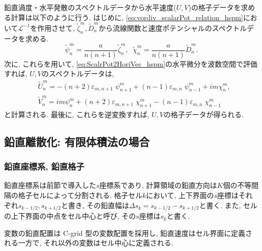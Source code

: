 鉛直渦度・水平発散のスペクトルデータから水平速度($U,V$)の格子データを求める計算は以下のように行う. 
はじめに, \eqref{eq:vordiv_scalarPot_relation_hspm}において$\mathscr{L}^{-1}$を作用させて, 
$\tilde{\zeta}^m_n, \tilde{D}^m_n$から流線関数と速度ポテンシャルのスペクトルデータを求める.
\begin{equation}
  \tilde{\psi}^m_n = \dfrac{a}{n(n+1)} \tilde{\zeta}^m_n,  \;\;
  \tilde{\chi}^m_n = \dfrac{a}{n(n+1)} \tilde{D}^m_n. 
\end{equation}
次に, これらを用いて, \eqref{eq:ScalrPot2HoriVec_hspm}の水平微分を波数空間で評価すれば, 
$U,V$のスペクトルデータは, 
\begin{equation}
\begin{split}
	&\tilde{U}^m_n 
	  = - (n+2)\varepsilon_{m,n+1} \;\psi^m_{n+1} 
	    + (n-1)\varepsilon_{m,n} \;\psi^m_{n-1} 
	    + im \chi^m_n, \\
	&\tilde{V}^m_n 
		= im \psi^m_n
		+ (n+2)\varepsilon_{m,n+1}\;\chi^m_{n+1} 
	    - (n-1)\varepsilon_{m,n} \;\chi^m_{n-1} 
\end{split}
\end{equation}
と計算される. 最後に, これらを逆変換すれば, $U,V$の格子データが得られる. 


\subsection{鉛直離散化: 有限体積法の場合}
\subsubsection*{鉛直座標系, 鉛直格子}
鉛直座標系は前節で導入した$s$座標系であり, 計算領域の鉛直方向は$K$個の不等間隔の格子セルによって分割される. 
格子セル$k$において, 上下界面の$s$座標はそれぞれ$s_{k-1/2}, s_{k+1/2}$と書き, 
その鉛直幅は$\Delta s_k = s_{k-1/2} - s_{k+1/2}$と書く. 
また, セルの上下界面の中点をセル中心と呼び, その$s$座標は$s_k$と書く. 

変数の鉛直配置は C-grid 型の変数配置を採用し, 鉛直速度はセル界面に定義される一方で, 
それ以外の変数はセル中心に定義される. 


